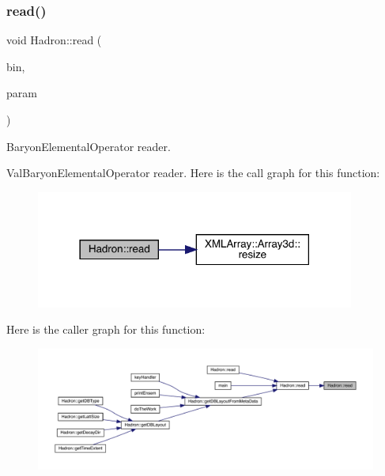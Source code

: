 \subsubsection{\texorpdfstring{read()}{read()}\hspace{0.1cm}{\footnotesize\ttfamily [63/94]}}
{\footnotesize\ttfamily void Hadron\+::read (\begin{DoxyParamCaption}\item[{\mbox{\hyperlink{classADATIO_1_1BinaryReader}{Binary\+Reader}} \&}]{bin,  }\item[{\mbox{\hyperlink{structHadron_1_1ValBaryonElementalOperator__t}{Val\+Baryon\+Elemental\+Operator\+\_\+t}} \&}]{param }\end{DoxyParamCaption})}



Baryon\+Elemental\+Operator reader. 

Val\+Baryon\+Elemental\+Operator reader. Here is the call graph for this function\+:
\nopagebreak
\begin{figure}[H]
\begin{center}
\leavevmode
\includegraphics[width=297pt]{d1/daf/namespaceHadron_ae87d364dcd64ddf5c60a1b4d6237e633_cgraph}
\end{center}
\end{figure}
Here is the caller graph for this function\+:
\nopagebreak
\begin{figure}[H]
\begin{center}
\leavevmode
\includegraphics[width=350pt]{d1/daf/namespaceHadron_ae87d364dcd64ddf5c60a1b4d6237e633_icgraph}
\end{center}
\end{figure}
\mbox{\label{namespaceHadron_aa192df4bf85988ad36b7c9b7c0c83dd3}} 
